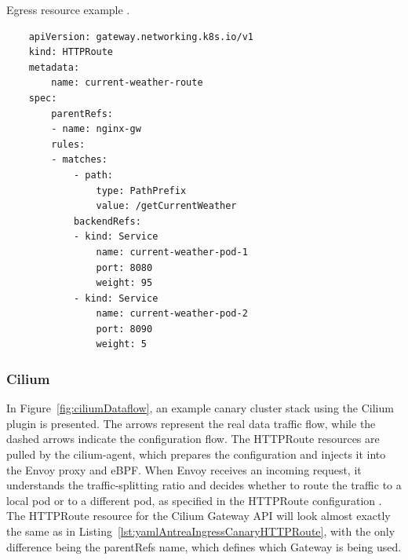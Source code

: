 \begin{listing}[htb]
    \centering
    \caption{Egress resource example \cite{AntreaDocs}.}
    \begin{verbatim}
    apiVersion: gateway.networking.k8s.io/v1
    kind: HTTPRoute
    metadata:
        name: current-weather-route
    spec:
        parentRefs:
        - name: nginx-gw
        rules:
        - matches:
            - path:
                type: PathPrefix
                value: /getCurrentWeather
            backendRefs:
            - kind: Service
                name: current-weather-pod-1
                port: 8080
                weight: 95
            - kind: Service
                name: current-weather-pod-2
                port: 8090
                weight: 5
    \end{verbatim}
    \label{lst:yamlAntreaIngressCanaryHTTPRoute}
\end{listing}

\subsubsection{Cilium}
\label{subsection:ciliumIngress}

In Figure~\ref{fig:ciliumDataflow}, an example canary cluster stack using the Cilium plugin is presented. The arrows represent the real data traffic flow, while the dashed arrows indicate the configuration flow. The HTTPRoute resources are pulled by the cilium-agent, which prepares the configuration and injects it into the Envoy proxy and eBPF. When Envoy receives an incoming request, it understands the traffic-splitting ratio and decides whether to route the traffic to a local pod or to a different pod, as specified in the HTTPRoute configuration \cite{CiliumDocs}. The HTTPRoute resource for the Cilium Gateway API will look almost exactly the same as in Listing~\ref{lst:yamlAntreaIngressCanaryHTTPRoute}, with the only difference being the parentRefs name, which defines which Gateway is being used.

